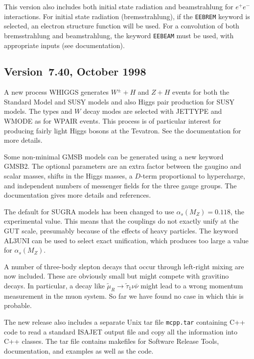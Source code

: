         This version also includes both initial state radiation and
beamstrahlung for $e^+e^-$ interactions. For initial state radiation
(bremsstrahlung), if the \verb|EEBREM| keyword is selected, an electron
structure function will be used. For a convolution of both
bremsstrahlung and beamstrahlung, the keyword \verb|EEBEAM| must be
used, with appropriate inputs (see documentation).

\subsection{Version~7.40, October 1998}

        A new process WHIGGS generates $W^\pm+H$ and $Z+H$ events for
both the Standard Model and SUSY models and also Higgs pair production
for SUSY models. The types and $W$ decay modes are selected with
JETTYPE and WMODE as for WPAIR events. This process is of particular
interest for producing fairly light Higgs bosons at the Tevatron. See
the documentation for more details.

        Some non-minimal GMSB models can be generated using a new
keyword GMSB2. The optional parameters are an extra factor between the
gaugino and scalar masses, shifts in the Higgs masses, a $D$-term
proportional to hypercharge, and independent numbers of messenger
fields for the three gauge groups. The documentation gives more
details and references.

        The default for SUGRA models has been changed to use
$\alpha_s(M_Z)=0.118$, the experimental value. This means that the
couplings do not exactly unify at the GUT scale, presumably because of
the effects of heavy particles. The keyword AL3UNI can be used to
select exact unification, which produces too large a value for
$\alpha_s(M_Z)$.

        A number of three-body slepton decays that occur through
left-right mixing are now included. These are obviously small but
might compete with gravitino decays. In particular, a decay like
$\tilde\mu_R \to \tilde\tau_1 \nu\bar\nu$ might lead to a wrong
momentum measurement in the muon system. So far we have found no case
in which this is probable.

        The new release also includes a separate Unix tar file
\verb|mcpp.tar| containing C++ code to read a standard ISAJET output
file and copy all the information into C++ classes. The tar file
contains makefiles for Software Release Tools, documentation, and
examples as well as the code.

